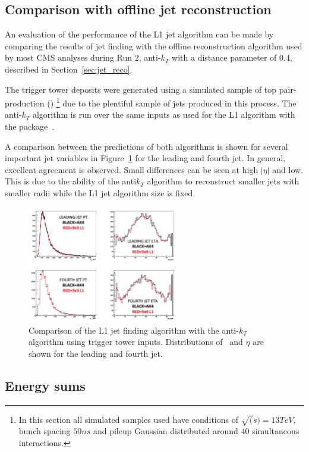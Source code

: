 \subsection{Comparison with offline jet reconstruction}

An evaluation of the performance of the L1 jet algorithm can be made by comparing
the results of jet finding with the offline reconstruction algorithm used by 
most CMS analyses during Run 2, anti-$k_T$ with a distance
parameter of 0.4, described in Section~\ref{sec:jet_reco}. 

The trigger tower deposits were generated using a simulated sample of 
top pair-production (\ttj) \footnote{In this section all simulated samples used have conditions 
of $\sqrt(s) = 13TeV$, bunch spacing $50ns$ and pileup Gaussian distributed around $40$ simultaneous interactions.} 
due to the plentiful sample of jets produced in this process. The anti-$k_T$ algorithm is run over the same inputs as
used for the L1 algorithm with the \FASTJET package~\cite{fastjet}.

A comparison between the predictions of both algorithms is shown for several important jet variables in 
Figure~\ref{fig:jet_l1s2_compak4} for the leading and fourth jet. In general, excellent agreement is observed. 
Small differences can be seen at high $|\eta|$ and low\pt. This is due to the ability 
of the anti$k_T$ algorithm to reconstruct smaller jets with smaller radii while the L1 jet
algorithm size is fixed.


\begin{figure}
\centering
    \includegraphics[width=0.6\textwidth]{./Figures/triggerUpgrade/jet_l1s2_compak4}
  \caption{Comparison of the L1 jet finding algorithm with the anti-$k_T$ algorithm using
  trigger tower inputs. Distributions of \pt~and $\eta$ are shown for the leading and fourth
  jet.}
  \label{fig:jet_l1s2_compak4}
\end{figure}  
\subsection{Energy sums}


